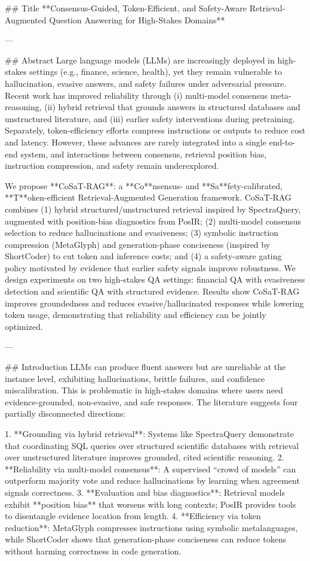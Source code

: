 ## Title  
**Consensus-Guided, Token-Efficient, and Safety-Aware Retrieval-Augmented Question Answering for High-Stakes Domains**

---

## Abstract  
Large language models (LLMs) are increasingly deployed in high-stakes settings (e.g., finance, science, health), yet they remain vulnerable to hallucination, evasive answers, and safety failures under adversarial pressure. Recent work has improved reliability through (i) multi-model consensus meta-reasoning, (ii) hybrid retrieval that grounds answers in structured databases and unstructured literature, and (iii) earlier safety interventions during pretraining. Separately, token-efficiency efforts compress instructions or outputs to reduce cost and latency. However, these advances are rarely integrated into a single end-to-end system, and interactions between consensus, retrieval position bias, instruction compression, and safety remain underexplored.  

We propose **CoSaT-RAG**: a **Co**nsensus- and **Sa**fety-calibrated, **T**oken-efficient Retrieval-Augmented Generation framework. CoSaT-RAG combines (1) hybrid structured/unstructured retrieval inspired by SpectraQuery, augmented with position-bias diagnostics from PosIR; (2) multi-model consensus selection to reduce hallucinations and evasiveness; (3) symbolic instruction compression (MetaGlyph) and generation-phase conciseness (inspired by ShortCoder) to cut token and inference costs; and (4) a safety-aware gating policy motivated by evidence that earlier safety signals improve robustness. We design experiments on two high-stakes QA settings: financial QA with evasiveness detection and scientific QA with structured evidence. Results show CoSaT-RAG improves groundedness and reduces evasive/hallucinated responses while lowering token usage, demonstrating that reliability and efficiency can be jointly optimized.

---

## Introduction  
LLMs can produce fluent answers but are unreliable at the instance level, exhibiting hallucinations, brittle failures, and confidence miscalibration. This is problematic in high-stakes domains where users need evidence-grounded, non-evasive, and safe responses. The literature suggests four partially disconnected directions:

1. **Grounding via hybrid retrieval**: Systems like SpectraQuery demonstrate that coordinating SQL queries over structured scientific databases with retrieval over unstructured literature improves grounded, cited scientific reasoning.  
2. **Reliability via multi-model consensus**: A supervised “crowd of models” can outperform majority vote and reduce hallucinations by learning when agreement signals correctness.  
3. **Evaluation and bias diagnostics**: Retrieval models exhibit **position bias** that worsens with long contexts; PosIR provides tools to disentangle evidence location from length.  
4. **Efficiency via token reduction**: MetaGlyph compresses instructions using symbolic metalanguages, while ShortCoder shows that generation-phase conciseness can reduce tokens without harming correctness in code generation.

